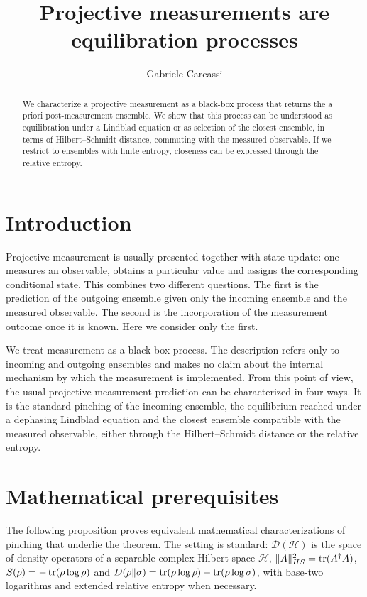 \documentclass{techbrief}
\title{Projective measurements are equilibration processes}
\author{Gabriele Carcassi}
\begin{document}
\maketitle

\begin{abstract}
	We characterize a projective measurement as a black-box process that returns the a priori post-measurement ensemble. We show that this process can be understood as equilibration under a Lindblad equation or as selection of the closest ensemble, in terms of Hilbert--Schmidt distance, commuting with the measured observable. If we restrict to ensembles with finite entropy, closeness can be expressed through the relative entropy.
\end{abstract}

\section{Introduction}

Projective measurement is usually presented together with state update: one measures an observable, obtains a particular value and assigns the corresponding conditional state. This combines two different questions. The first is the prediction of the outgoing ensemble given only the incoming ensemble and the measured observable. The second is the incorporation of the measurement outcome once it is known. Here we consider only the first.

We treat measurement as a black-box process. The description refers only to incoming and outgoing ensembles and makes no claim about the internal mechanism by which the measurement is implemented. From this point of view, the usual projective-measurement prediction can be characterized in four ways. It is the standard pinching of the incoming ensemble, the equilibrium reached under a dephasing Lindblad equation and the closest ensemble compatible with the measured observable, either through the Hilbert--Schmidt distance or the relative entropy.

\section{Mathematical prerequisites}

The following proposition proves equivalent mathematical characterizations of pinching that underlie the theorem. The setting is standard: $\mathcal{D}(\mathcal{H})$ is the space of density operators of a separable complex Hilbert space $\mathcal{H}$, $\|A\|_{HS}^2=\operatorname{tr}(A^\dagger A)$, $S(\rho)=-\operatorname{tr}(\rho\log\rho)$ and $D(\rho\Vert\sigma)=\operatorname{tr}(\rho\log\rho)-\operatorname{tr}(\rho\log\sigma)$, with base-two logarithms and extended relative entropy when necessary.
\end{document}
